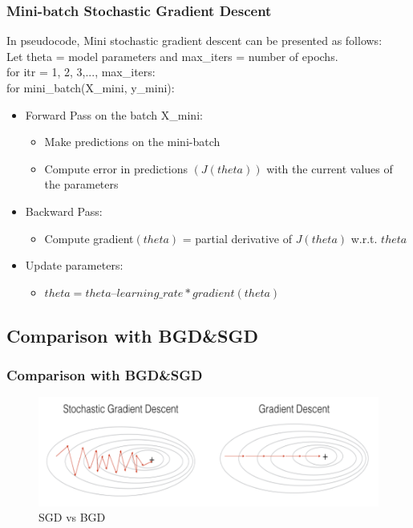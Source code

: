 \documentclass[cjk]{beamer}
\begin{document}
\begin{CJK*}{GBK}{kai}
\begin{frame}
\frametitle{Mini-batch Stochastic Gradient Descent}
In pseudocode, Mini stochastic gradient descent can be presented as follows:\\
Let theta = model parameters and max\_iters = number of epochs.\\
for itr = 1, 2, 3,..., max\_iters:\\
\quad for mini\_batch(X\_mini, y\_mini):
	\begin{itemize}
	\item Forward Pass on the batch X\_mini:
		\begin{itemize}
		\item Make predictions on the mini-batch
		\item Compute error in predictions $(J(theta))$ with the current values of the parameters
		\end{itemize}
	\end{itemize}
	\begin{itemize}
	\item Backward Pass:
		\begin{itemize}
		\item Compute gradient$(theta)$ = partial derivative of $J(theta)$ w.r.t. $theta$
		\end{itemize}
	\end{itemize}
	\begin{itemize}
	\item Update parameters:
		\begin{itemize}
		\item $theta = theta – learning\_rate*gradient(theta)$
		\end{itemize}
	\end{itemize}
\end{frame}

\subsection{Comparison with BGD\&SGD}
\begin{frame}
\frametitle{Comparison with BGD\&SGD}
\begin{figure}
	\begin{minipage}[t]{0.6\linewidth} %
		\centering
		\includegraphics[width= \textwidth]{c1.png}
		\caption{SGD vs BGD}
		\label{fig:side:a}
	\end{minipage}%


\end{figure}
\end{frame}
\end{CJK*}
\end{document}
